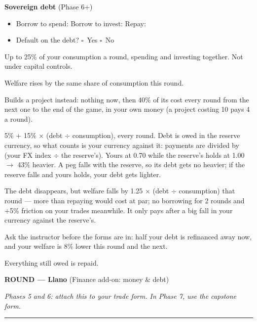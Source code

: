 \documentclass[11pt]{article}
\newcommand{\blank}[1]{\underline{\hspace{#1}}}
\newcommand{\boxx}{$\square$}
\newcommand{\hr}{\par\vspace{2pt}\noindent\rule{\linewidth}{0.4pt}\par\vspace{2pt}}
\begin{document}
\vspace{4pt}
{\bfseries Sovereign debt} (Phase 6+)\par
\begin{itemize}[nosep,leftmargin=1.4em]
  \item Borrow to spend: \blank{2.2cm} \quad Borrow to invest: \blank{2.2cm} \quad Repay: \blank{2.2cm}
  \item Default on the debt? \quad \boxx\ Yes \quad \boxx\ No
\end{itemize}
{\small
\begin{description}[nosep,style=sameline,leftmargin=5.6em,font=\normalfont\bfseries]
  \item[Borrow] Up to 25\% of your consumption a round, spending and investing together. Not under capital controls.
  \item[Spend] Welfare rises by the same share of consumption this round.
  \item[Invest] Builds a project instead: nothing now, then 40\% of its cost every round from the next one to the end of the game, in your own money (a project costing 10 pays 4 a round).
  \item[Interest] 5\% + 15\% $\times$ (debt $\div$ consumption), every round. Debt is owed in the reserve currency, so what counts is your currency against it: payments are divided by (your FX index $\div$ the reserve's). Yours at 0.70 while the reserve's holds at 1.00 $\to$ 43\% heavier. A peg falls with the reserve, so its debt gets no heavier; if the reserve falls and yours holds, your debt gets lighter.
  \item[Default] The debt disappears, but welfare falls by 1.25 $\times$ (debt $\div$ consumption) that round --- more than repaying would cost at par; no borrowing for 2 rounds and +5\% friction on your trades meanwhile. It only pays after a big fall in your currency against the reserve's.
  \item[IMF] Ask the instructor before the forms are in: half your debt is refinanced away now, and your welfare is 8\% lower this round and the next.
  \item[Last round] Everything still owed is repaid.
\end{description}}

\newpage

{\large\bfseries ROUND \blank{1cm} --- Llano} \hfill (Finance add-on: money \& debt)\par
\textit{Phases 5 and 6: attach this to your trade form. In Phase 7, use the capstone form.}
\hr
\end{document}
